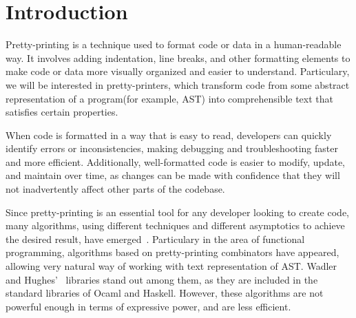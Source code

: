 \documentclass[14pt]{constructor-diploma}
\begin{document}
\maketitle
\tableofcontents
\section*{Introduction}
Pretty-printing is a technique used to format code or data in a human-readable way.
It involves adding indentation, line breaks, and other formatting elements to make code or data more visually organized and easier to understand.
Particulary, we will be interested in pretty-printers, 
which transform code from some abstract representation of a program(for example, AST)
into comprehensible text that satisfies certain properties.

When code is formatted in a way that is easy to read,
developers can quickly identify errors or inconsistencies, 
making debugging and troubleshooting faster and more efficient.
Additionally, well-formatted code is easier to modify, update, and maintain over time, 
as changes can be made with confidence that they will not inadvertently affect other parts of the codebase.

Since pretty-printing is an essential tool for any developer looking to create code, many algorithms, using different techniques and different asymptotics to achieve the desired result,
have emerged~\cite{oppen,azero,hughes,swierstra}. Particulary in the area of functional programming, algorithms based on pretty-printing combinators have appeared,
allowing very natural way of working with text representation of AST. 
Wadler~\cite{wadler} and Hughes'~\cite{hughes} libraries stand out among them, as they are included in the standard libraries of Ocaml and Haskell.
However, these algorithms are not powerful enough in terms of expressive power, and are less efficient.
\end{document}
